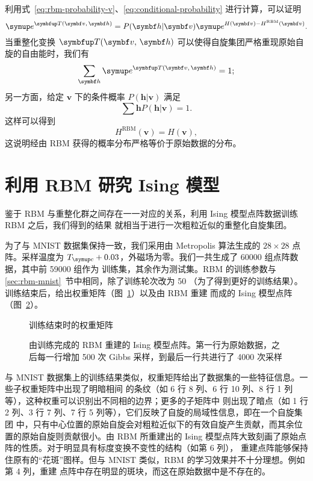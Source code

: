 利用式~\eqref{eq:rbm-probability-v}、\eqref{eq:conditional-probability} 进行计算，可以证明
\begin{equation}
  \ee^{\opT(\bm{v},\,\bm{h})} = P(\bm{h}|\bm{v}) \ee^{H(\bm{v})-H^{\text{RBM}}(\bm{v})}.
\end{equation}
当重整化变换 $\opT(\bm{v},\,\bm{h})$ 可以使得自旋集团严格重现原始自旋的自由能时，我们有
\begin{equation}
  \sum_{\bm{h}} \ee^{\opT(\bm{v},\,\bm{h})} = 1;
\end{equation}
另一方面，给定 $\bm{v}$ 下的条件概率 $P(\bm{h}|\bm{v})$ 满足
\begin{equation}
  \sum{\bm{h}} P(\bm{h}|\bm{v}) = 1.
\end{equation}
这样可以得到
\begin{equation}
  H^{\text{RBM}}(\bm{v}) = H(\bm{v}),
\end{equation}
这说明经由 RBM 获得的概率分布严格等价于原始数据的分布。

\section{利用 RBM 研究 Ising 模型}

鉴于 RBM 与重整化群之间存在一一对应的关系，利用 Ising 模型点阵数据训练 RBM 之后，我们得到的结果
就相当于进行一次粗粒近似的重整化自旋集团。

为了与 MNIST 数据集保持一致，我们采用由 Metropolis 算法生成的 $28 \times 28$ 点阵。采样温度为
$\Tc+\num{0.03}$，外磁场为零。我们一共生成了 \num{60000} 组点阵数据，其中前 \num{59000} 组作为
训练集，其余作为测试集。RBM 的训练参数与 \ref{sec:rbm-mnist}~节中相同，除了训练轮次改为 50
（为了得到更好的训练结果）。训练结束后，给出权重矩阵（图~\ref{fig:ising-weight}）以及由 RBM 重建
而成的 Ising 模型点阵（图~\ref{fig:ising-samples}）。

\begin{figure}[htb]
  \centering
  \caption{训练结束时的权重矩阵}
  \label{fig:ising-weight}
\end{figure}

\begin{figure}[htb]
  \centering
  \caption{由训练完成的 RBM 重建的 Ising 模型点阵。第一行为原始数据，之后每一行增加 \num{500}
    次 Gibbs 采样，到最后一行共进行了 \num{4000} 次采样}
  \label{fig:ising-samples}
\end{figure}

与 MNIST 数据集上的训练结果类似，权重矩阵给出了数据集的一些特征信息。一些子权重矩阵中出现了明暗相间
的条纹（如 6 行 8 列、6 行 10 列、8 行 1 列等），这种权重可以识别出不同相的边界；更多的子矩阵中
则出现了暗点（如 1 行 2 列、3 行 7 列、7 行 5 列等），它们反映了自旋的局域性信息，即在一个自旋集团
中，只有中心位置的原始自旋会对粗粒近似下的有效自旋产生贡献，而其余位置的原始自旋则贡献很小。由 RBM
所重建出的 Ising 模型点阵大致刻画了原始点阵的性质。对于明显具有标度变换不变性的结构（如第 6 列），
重建点阵能够保持住原有的“花斑”图样。但与 MNIST 类似，RBM 的学习效果并不十分理想。例如第 4 列，重建
点阵中存在明显的斑块，而这在原始数据中是不存在的。

